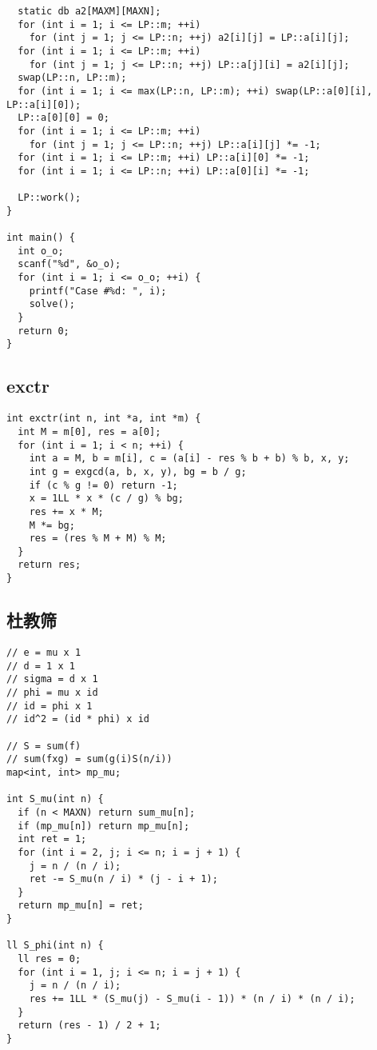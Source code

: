 \documentclass[twoside]{article}
\begin{document}
\begin{lstlisting}
  static db a2[MAXM][MAXN];
  for (int i = 1; i <= LP::m; ++i)
    for (int j = 1; j <= LP::n; ++j) a2[i][j] = LP::a[i][j];
  for (int i = 1; i <= LP::m; ++i)
    for (int j = 1; j <= LP::n; ++j) LP::a[j][i] = a2[i][j];
  swap(LP::n, LP::m);
  for (int i = 1; i <= max(LP::n, LP::m); ++i) swap(LP::a[0][i], LP::a[i][0]);
  LP::a[0][0] = 0;
  for (int i = 1; i <= LP::m; ++i)
    for (int j = 1; j <= LP::n; ++j) LP::a[i][j] *= -1;
  for (int i = 1; i <= LP::m; ++i) LP::a[i][0] *= -1;
  for (int i = 1; i <= LP::n; ++i) LP::a[0][i] *= -1;

  LP::work();
}

int main() {
  int o_o;
  scanf("%d", &o_o);
  for (int i = 1; i <= o_o; ++i) {
    printf("Case #%d: ", i);
    solve();
  }
  return 0;
}

\end{lstlisting}
\subsection{exctr}
\begin{lstlisting}
int exctr(int n, int *a, int *m) {
  int M = m[0], res = a[0];
  for (int i = 1; i < n; ++i) {
    int a = M, b = m[i], c = (a[i] - res % b + b) % b, x, y;
    int g = exgcd(a, b, x, y), bg = b / g;
    if (c % g != 0) return -1;
    x = 1LL * x * (c / g) % bg;
    res += x * M;
    M *= bg;
    res = (res % M + M) % M;
  }
  return res;
}

\end{lstlisting}
\subsection{杜教筛}
\begin{lstlisting}
// e = mu x 1
// d = 1 x 1
// sigma = d x 1
// phi = mu x id
// id = phi x 1
// id^2 = (id * phi) x id

// S = sum(f)
// sum(fxg) = sum(g(i)S(n/i))
map<int, int> mp_mu;

int S_mu(int n) {
  if (n < MAXN) return sum_mu[n];
  if (mp_mu[n]) return mp_mu[n];
  int ret = 1;
  for (int i = 2, j; i <= n; i = j + 1) {
    j = n / (n / i);
    ret -= S_mu(n / i) * (j - i + 1);
  }
  return mp_mu[n] = ret;
}

ll S_phi(int n) {
  ll res = 0;
  for (int i = 1, j; i <= n; i = j + 1) {
    j = n / (n / i);
    res += 1LL * (S_mu(j) - S_mu(i - 1)) * (n / i) * (n / i);
  }
  return (res - 1) / 2 + 1;
}

\end{lstlisting}
\end{document}
